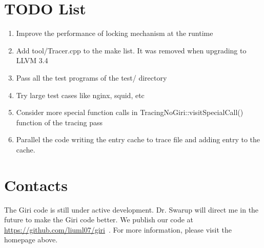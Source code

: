 \documentclass[DIV=calc, paper=a4, fontsize=11pt, twocolumn]{scrartcl}
\begin{document}
\section*{TODO List}
\begin{enumerate}
	\item Improve the performance of locking mechanism at the runtime
	\item Add tool/Tracer.cpp to the make list. It was removed when upgrading to LLVM 3.4
	\item Pass all the test programs of the test/ directory
	\item Try large test cases like nginx, squid, etc
	\item Consider more special function calls in TracingNoGiri::visitSpecialCall() function of the tracing pass
	\item Parallel the code writing the entry cache to trace file and adding entry to the cache.
\end{enumerate}

\section*{Contacts}
The Giri code is still under active development.
Dr. Swarup will direct me in the future to make the Giri code better.
We publish our code at \href{https://github.com/liuml07/giri}{https://github.com/liuml07/giri}~\cite{giri}.
For more information, please visit the homepage above.


 
\end{document}
